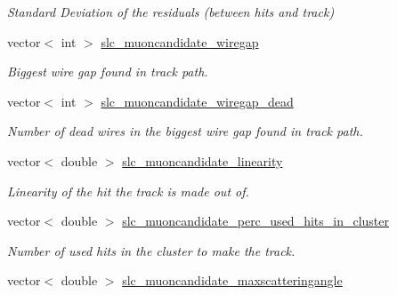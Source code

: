 \begin{DoxyCompactItemize}
\begin{DoxyCompactList}\small\item\em Standard Deviation of the residuals (between hits and track) \end{DoxyCompactList}\item 
\hypertarget{classUBXSecEvent_a2d4129ec5151ca996a427ddb7026978c}{vector$<$ int $>$ \hyperlink{classUBXSecEvent_a2d4129ec5151ca996a427ddb7026978c}{slc\-\_\-muoncandidate\-\_\-wiregap}}\label{classUBXSecEvent_a2d4129ec5151ca996a427ddb7026978c}

\begin{DoxyCompactList}\small\item\em Biggest wire gap found in track path. \end{DoxyCompactList}\item 
\hypertarget{classUBXSecEvent_af5c4c1f7a954e46c752c3f323adade2b}{vector$<$ int $>$ \hyperlink{classUBXSecEvent_af5c4c1f7a954e46c752c3f323adade2b}{slc\-\_\-muoncandidate\-\_\-wiregap\-\_\-dead}}\label{classUBXSecEvent_af5c4c1f7a954e46c752c3f323adade2b}

\begin{DoxyCompactList}\small\item\em Number of dead wires in the biggest wire gap found in track path. \end{DoxyCompactList}\item 
\hypertarget{classUBXSecEvent_aa385ab36f52d07e5cdd303e82ae8035f}{vector$<$ double $>$ \hyperlink{classUBXSecEvent_aa385ab36f52d07e5cdd303e82ae8035f}{slc\-\_\-muoncandidate\-\_\-linearity}}\label{classUBXSecEvent_aa385ab36f52d07e5cdd303e82ae8035f}

\begin{DoxyCompactList}\small\item\em Linearity of the hit the track is made out of. \end{DoxyCompactList}\item 
\hypertarget{classUBXSecEvent_a946ace636527632fed09f2d9e075e87e}{vector$<$ double $>$ \hyperlink{classUBXSecEvent_a946ace636527632fed09f2d9e075e87e}{slc\-\_\-muoncandidate\-\_\-perc\-\_\-used\-\_\-hits\-\_\-in\-\_\-cluster}}\label{classUBXSecEvent_a946ace636527632fed09f2d9e075e87e}

\begin{DoxyCompactList}\small\item\em Number of used hits in the cluster to make the track. \end{DoxyCompactList}\item 
\hypertarget{classUBXSecEvent_ad1f8e0086022ff8db9be1bbe8860c6d1}{vector$<$ double $>$ \hyperlink{classUBXSecEvent_ad1f8e0086022ff8db9be1bbe8860c6d1}{slc\-\_\-muoncandidate\-\_\-maxscatteringangle}}\label{classUBXSecEvent_ad1f8e0086022ff8db9be1bbe8860c6d1}


\end{DoxyCompactItemize}
